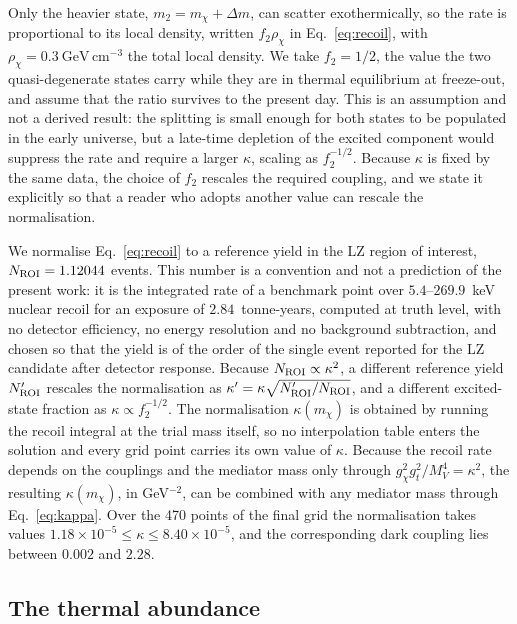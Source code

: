 Only the heavier state, $m_2=m_\chi+\Delta m$, can scatter exothermically, so the rate is proportional to its local density, written $f_2\rho_\chi$ in Eq.~\eqref{eq:recoil}, with $\rho_\chi=0.3\ \mathrm{GeV\,cm^{-3}}$ the total local density. We take $f_2=1/2$, the value the two quasi-degenerate states carry while they are in thermal equilibrium at freeze-out, and assume that the ratio survives to the present day. This is an assumption and not a derived result: the splitting is small enough for both states to be populated in the early universe, but a late-time depletion of the excited component would suppress the rate and require a larger $\kappa$, scaling as $f_2^{-1/2}$. Because $\kappa$ is fixed by the same data, the choice of $f_2$ rescales the required coupling, and we state it explicitly so that a reader who adopts another value can rescale the normalisation.

We normalise Eq.~\eqref{eq:recoil} to a reference yield in the LZ region of interest, $N_{\rm ROI}=1.12044$ events. This number is a convention and not a prediction of the present work: it is the integrated rate of a benchmark point over $5.4$--$269.9$~keV nuclear recoil for an exposure of $2.84$~tonne-years, computed at truth level, with no detector efficiency, no energy resolution and no background subtraction, and chosen so that the yield is of the order of the single event reported for the LZ candidate after detector response. Because $N_{\rm ROI}\propto\kappa^{2}$, a different reference yield $N'_{\rm ROI}$ rescales the normalisation as $\kappa'=\kappa\sqrt{N'_{\rm ROI}/N_{\rm ROI}}$, and a different excited-state fraction as $\kappa\propto f_2^{-1/2}$. The normalisation $\kappa(m_\chi)$ is obtained by running the recoil integral at the trial mass itself, so no interpolation table enters the solution and every grid point carries its own value of $\kappa$. Because the recoil rate depends on the couplings and the mediator mass only through $g_\chi^2g_t^2/M_V^4=\kappa^2$, the resulting $\kappa(m_\chi)$, in GeV$^{-2}$, can be combined with any mediator mass through Eq.~\eqref{eq:kappa}. Over the 470 points of the final grid the normalisation takes values $1.18\times10^{-5}\le\kappa\le8.40\times10^{-5}$, and the corresponding dark coupling lies between $0.002$ and $2.28$.

\subsection{The thermal abundance}


